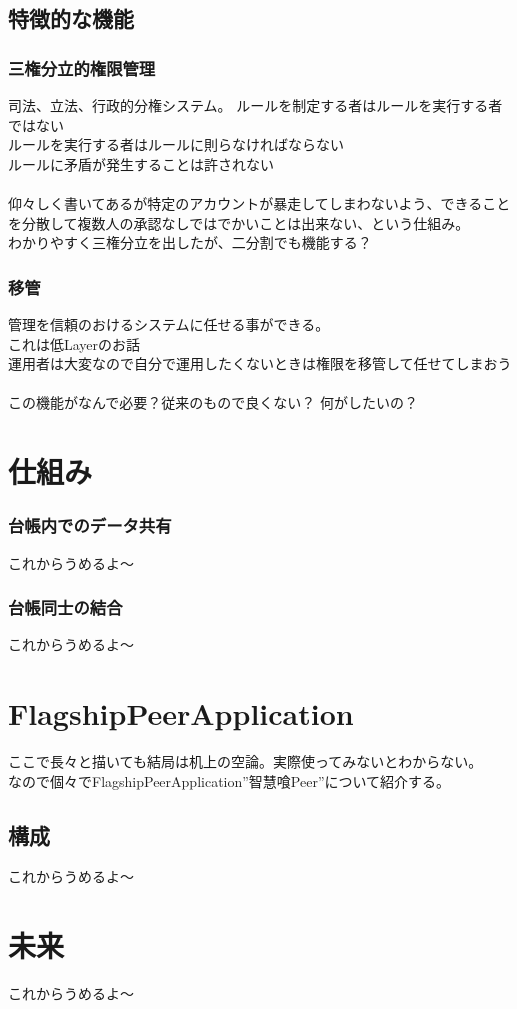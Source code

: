 \documentclass[10pt,a4paper]{jarticle}
\begin{document}
\begin{multicols}{2}
\subsection{特徴的な機能}

\subsubsection{三権分立的権限管理}
司法、立法、行政的分権システム。
ルールを制定する者はルールを実行する者ではない\\
ルールを実行する者はルールに則らなければならない\\
ルールに矛盾が発生することは許されない\\
\\
仰々しく書いてあるが特定のアカウントが暴走してしまわないよう、できることを分散して複数人の承認なしではでかいことは出来ない、という仕組み。\\
わかりやすく三権分立を出したが、二分割でも機能する？\\

\subsubsection{移管}
管理を信頼のおけるシステムに任せる事ができる。\\
これは低Layerのお話\\
運用者は大変なので自分で運用したくないときは権限を移管して任せてしまおう\\
\\
この機能がなんで必要？従来のもので良くない？
何がしたいの？


\section{仕組み}

\subsubsection{台帳内でのデータ共有}
これからうめるよ〜

\subsubsection{台帳同士の結合}
これからうめるよ〜

\section{FlagshipPeerApplication}
ここで長々と描いても結局は机上の空論。実際使ってみないとわからない。\\
なので個々でFlagshipPeerApplication”智慧喰Peer”について紹介する。

\subsection{構成}
これからうめるよ〜


\section{未来}
これからうめるよ〜

\end{multicols}
\end{document}
